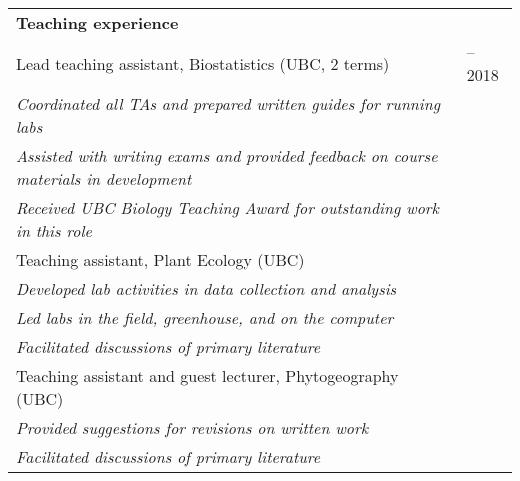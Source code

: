 \documentclass[letterpaper,11pt,oneside]{article}
\begin{document}
\def\arraystretch{1.1}
\noindent \begin{tabular}{@{} >{\raggedright\arraybackslash}p{15.5cm} >{\raggedright\arraybackslash}p{1.7cm}}

 \textbf{Teaching experience}  & \\
  Lead teaching assistant, Biostatistics (UBC, 2 terms) & 2017--2018 \\
  \hspace{5mm}\textit{Coordinated all TAs and prepared written guides for running labs} &  \\
  \hspace{5mm}\textit{Assisted with writing exams and provided feedback on course materials in development} &  \\
  \hspace{5mm}\textit{Received UBC Biology Teaching Award for outstanding work in this role} &  \\
 Teaching assistant, Plant Ecology (UBC) & 2017 \\
  \hspace{5mm}\textit{Developed lab activities in data collection and analysis} & \\
  \hspace{5mm}\textit{Led labs in the field, greenhouse, and on the computer} &  \\  
  \hspace{5mm}\textit{Facilitated discussions of primary literature} &   \\
 Teaching assistant and guest lecturer, Phytogeography (UBC) & 2016 \\ 
  \hspace{5mm}\textit{Provided suggestions for revisions on written work} &   \\
  \hspace{5mm}\textit{Facilitated discussions of primary literature} &   \\
\end{tabular}
\smallskip
\end{document}
